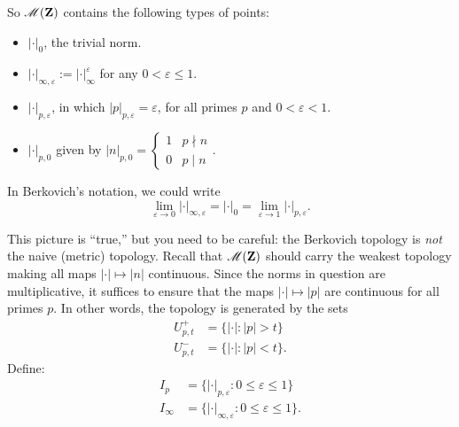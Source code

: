 So $\operatorname{\mathscr{M}}(\mathbf{Z})$ contains the following types of points:
\begin{itemize}
\item
$|\cdot|_0$, the trivial norm.

\item
$|\cdot|_{\infty,\varepsilon} := |\cdot|_\infty^\varepsilon$ for any 
$0<\varepsilon\leqslant 1$. 

\item
$|\cdot|_{p,\varepsilon}$, in which $|p|_{p,\varepsilon}=\varepsilon$, for all 
primes $p$ and $0<\varepsilon<1$. 

\item
$|\cdot|_{p,0}$ given by 
$|n|_{p,0} = \begin{cases} 1 & p\nmid n \\ 0 & p\mid n\end{cases}$. 
\end{itemize}
In Berkovich's notation, we could write 
\[
	\lim_{\varepsilon\to 0} |\cdot|_{\infty,\varepsilon} = |\cdot|_0 = \lim_{\varepsilon\to 1} |\cdot|_{p,\varepsilon} .
\]

\begin{center}
\end{center}

This picture is ``true,'' but you need 
to be careful: the Berkovich topology is \emph{not} the naive (metric) 
topology. Recall that $\operatorname{\mathscr{M}}(\mathbf{Z})$ should carry the weakest topology 
making all maps $|\cdot|\mapsto |n|$ continuous. Since the norms in question 
are multiplicative, it suffices to ensure that the maps $|\cdot|\mapsto |p|$ 
are continuous for all primes $p$. In other words, the topology is generated by 
the sets 
\begin{align*}
	U_{p,t}^+ &= \{|\cdot|\colon |p|>t\} \\
	U_{p,t}^- &= \{|\cdot|\colon |p|<t\} .
\end{align*}
Define: 
\begin{align*}
	I_p &= \{|\cdot|_{p,\varepsilon}\colon 0\leqslant \varepsilon \leqslant 1\} \\
	I_\infty &= \{|\cdot|_{\infty,\varepsilon}\colon 0\leqslant \varepsilon \leqslant 1\} .
\end{align*}

